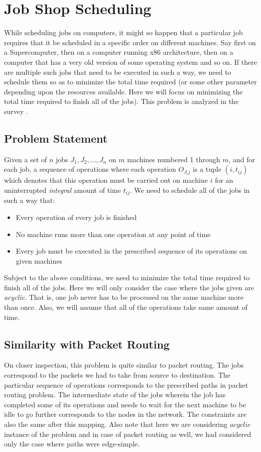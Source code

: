 \section{Job Shop Scheduling}
While scheduling jobs on computers, it might so happen that a particular job requires that it be scheduled in a specific order on different machines. Say first on a Supercomputer, then on a computer running x86 architecture, then on a computer that has a very old version of some operating system and so on. If there are multiple such jobs that need to be executed in such a way, we need to schedule them so as to minimize the total time required (or some other parameter depending upon the resources available. Here we will focus on minimizing the total time required to finish all of the jobs). This problem is analyzed in the survey \cite{srinivasan}.

\subsection{Problem Statement}
Given a set of $n$ jobs $J_1,J_2,\ldots,J_n $ on $m$ machines numbered 1 through $m$, and for each job, a sequence of operations where each operation $O_{J_ij} $ is a tuple $(i,t_{ij})$ which denotes that this operation must be carried out on machine $i$ for an uninterrupted \emph{integral} amount of time $t_{ij}$. We need to schedule all of the jobs in such a way that:
\begin{itemize}
 \item Every operation of every job is finished
 \item No machine runs more than one operation at any point of time
 \item Every job must be executed in the prescribed sequence of its operations on given machines
\end{itemize}

Subject to the above conditions, we need to minimize the total time required to finish all of the jobs. Here we will only consider the case where the jobs given are \emph{acyclic}. That is, one job never has to be processed on the same machine more than once. Also, we will assume that all of the operations take same amount of time.

\subsection{Similarity with Packet Routing}
On closer inspection, this problem is quite similar to packet routing. The jobs correspond to the packets we had to take from source to destination. The particular sequence of operations corresponds to the prescribed paths in packet routing problem. The intermediate state of the jobs wherein the job has completed some of its operations and needs to wait for the next machine to be idle to go further corresponds to the nodes in the network. The constraints are also the same after this mapping. Also note that here we are considering $acyclic$ instance of the problem and in case of packet routing as well, we had considered only the case where paths were edge-simple.

